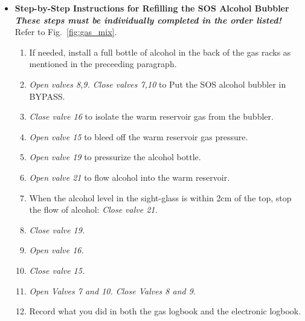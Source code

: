 \begin{itemize}
\item{ \bf{Step-by-Step Instructions for Refilling the SOS Alcohol Bubbler}\\
\em{These steps must be individually completed in the order listed!}}\\
Refer to Fig.~\ref{fig:gas_mix}. 
\begin{enumerate}
\item{If needed, install a full bottle of alcohol in the back of the gas racks as mentioned in the preceeding paragraph.}
\item{{\em Open valves 8,9. Close valves 7,10} to Put the SOS alcohol bubbler in BYPASS.}
\item{{\em Close valve 16} to isolate the warm reservoir gas from the bubbler.}
\item{{\em Open valve 15} to bleed off the warm reservoir gas pressure.}
\item{{\em Open valve 19} to pressurize the alcohol bottle.}
\item{{\em Open valve 21} to flow alcohol into the warm reservoir.}
\item{When the alcohol level in the sight-glass is within 2cm of the top, stop
the flow of alcohol: {\em Close valve 21.}}
\item{{\em Close valve 19.}}
\item{{\em Open valve 16.}}
\item{{\em Close valve 15.}}
\item{{\em Open Valves 7 and 10. Close Valves 8 and 9.}}
\item{Record what you did in both the gas logbook and the electronic logbook.} 
\end{enumerate}


\end{itemize}
